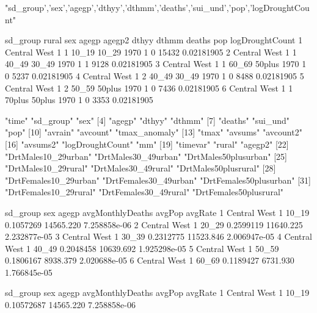 \documentclass[a4paper]{article}                %
\begin{document}
\begin{Schunk}
\begin{Soutput}
[1] "sd_group','sex','agegp','dthyy','dthmm','deaths','sui_und','pop','logDroughtCount"
\end{Soutput}
\begin{Soutput}
      sd_group rural sex  agegp agegp2 dthyy dthmm deaths   pop logDroughtCount
1 Central West     1   1  10_19  10_29  1970     1      0 15432      0.02181905
2 Central West     1   1  40_49  30_49  1970     1      1  9128      0.02181905
3 Central West     1   1  60_69 50plus  1970     1      0  5237      0.02181905
4 Central West     1   2  40_49  30_49  1970     1      0  8488      0.02181905
5 Central West     1   2  50_59 50plus  1970     1      0  7436      0.02181905
6 Central West     1   1 70plus 50plus  1970     1      0  3353      0.02181905
\end{Soutput}
\begin{Soutput}
 [1] "time"                  "sd_group"              "sex"                  
 [4] "agegp"                 "dthyy"                 "dthmm"                
 [7] "deaths"                "sui_und"               "pop"                  
[10] "avrain"                "avcount"               "tmax_anomaly"         
[13] "tmax"                  "avsums"                "avcount2"             
[16] "avsums2"               "logDroughtCount"       "mm"                   
[19] "timevar"               "rural"                 "agegp2"               
[22] "DrtMales10_29urban"    "DrtMales30_49urban"    "DrtMales50plusurban"  
[25] "DrtMales10_29rural"    "DrtMales30_49rural"    "DrtMales50plusrural"  
[28] "DrtFemales10_29urban"  "DrtFemales30_49urban"  "DrtFemales50plusurban"
[31] "DrtFemales10_29rural"  "DrtFemales30_49rural"  "DrtFemales50plusrural"
\end{Soutput}
\begin{Soutput}
      sd_group sex agegp avgMonthlyDeaths    avgPop      avgRate
1 Central West   1 10_19        0.1057269 14565.220 7.258858e-06
2 Central West   1 20_29        0.2599119 11640.225 2.232877e-05
3 Central West   1 30_39        0.2312775 11523.846 2.006947e-05
4 Central West   1 40_49        0.2048458 10639.692 1.925298e-05
5 Central West   1 50_59        0.1806167  8938.379 2.020688e-05
6 Central West   1 60_69        0.1189427  6731.930 1.766845e-05
\end{Soutput}
\begin{Soutput}
       sd_group sex  agegp avgMonthlyDeaths    avgPop      avgRate
1  Central West   1  10_19       0.10572687 14565.220 7.258858e-06

\end{Soutput}
\end{Schunk}
\end{document}
